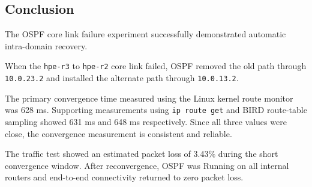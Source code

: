 \subsection{Conclusion}

The OSPF core link failure experiment successfully demonstrated automatic intra-domain recovery.

When the \texttt{hpe-r3} to \texttt{hpe-r2} core link failed, OSPF removed the old path through \texttt{10.0.23.2} and installed the alternate path through \texttt{10.0.13.2}.

The primary convergence time measured using the Linux kernel route monitor was 628 ms. Supporting measurements using \texttt{ip route get} and BIRD route-table sampling showed 631 ms and 648 ms respectively. Since all three values were close, the convergence measurement is consistent and reliable.

The traffic test showed an estimated packet loss of 3.43\% during the short convergence window. After reconvergence, OSPF was Running on all internal routers and end-to-end connectivity returned to zero packet loss.
